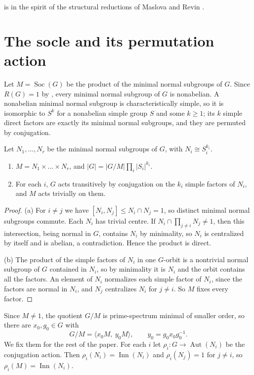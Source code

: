 \documentclass[11pt,colorlinks]{charlie}
\DeclareMathOperator{\Aut}{Aut}
\DeclareMathOperator{\Inn}{Inn}
\DeclareMathOperator{\Soc}{Soc}
\newcommand{\gen}[1]{\langle #1\rangle}
\begin{document}
 is in the spirit of the structural reductions of Maslova and Revin \cite{MR13}.

\section{The socle and its permutation action}\label{sec:socle}

Let $M=\Soc(G)$ be the product of the minimal normal subgroups of $G$. Since $R(G)=1$ by , every minimal normal subgroup of $G$ is nonabelian. A nonabelian minimal normal subgroup is characteristically simple, so it is isomorphic to $S^k$ for a nonabelian simple group $S$ and some $k\ge1$; its $k$ simple direct factors are exactly its minimal normal subgroups, and they are permuted by conjugation.

\begin{lemma}\label{lem:socle}
Let $N_1,\dots,N_r$ be the minimal normal subgroups of $G$, with $N_i\cong S_i^{k_i}$.
\begin{enumerate}
\item $M=N_1\times\dots\times N_r$, and $|G|=|G/M|\prod_i|S_i|^{k_i}$.
\item For each $i$, $G$ acts transitively by conjugation on the $k_i$ simple factors of $N_i$, and $M$ acts trivially on them.
\end{enumerate}
\end{lemma}

\begin{proof}
(a) For $i\ne j$ we have $[N_i,N_j]\le N_i\cap N_j=1$, so distinct minimal normal subgroups commute. Each $N_i$ has trivial centre. If $N_i\cap\prod_{j\ne i}N_j\ne1$, then this intersection, being normal in $G$, contains $N_i$ by minimality, so $N_i$ is centralized by itself and is abelian, a contradiction. Hence the product is direct.

(b) The product of the simple factors of $N_i$ in one $G$-orbit is a nontrivial normal subgroup of $G$ contained in $N_i$, so by minimality it is $N_i$ and the orbit contains all the factors. An element of $N_i$ normalizes each simple factor of $N_i$, since the factors are normal in $N_i$, and $N_j$ centralizes $N_i$ for $j\ne i$. So $M$ fixes every factor.
\end{proof}

Since $M\ne1$, the quotient $G/M$ is prime-spectrum minimal of smaller order, so there are $x_0,g_0\in G$ with
\begin{equation}\label{eq:quotient-pair}
 G/M=\gen{x_0M,\ y_0M},\qquad y_0=g_0x_0g_0^{-1}.
\end{equation}
We fix them for the rest of the paper. For each $i$ let $\rho_i\colon G\to\Aut(N_i)$ be the conjugation action. Then $\rho_i(N_i)=\Inn(N_i)$ and $\rho_i(N_j)=1$ for $j\ne i$, so $\rho_i(M)=\Inn(N_i)$.
\end{document}

